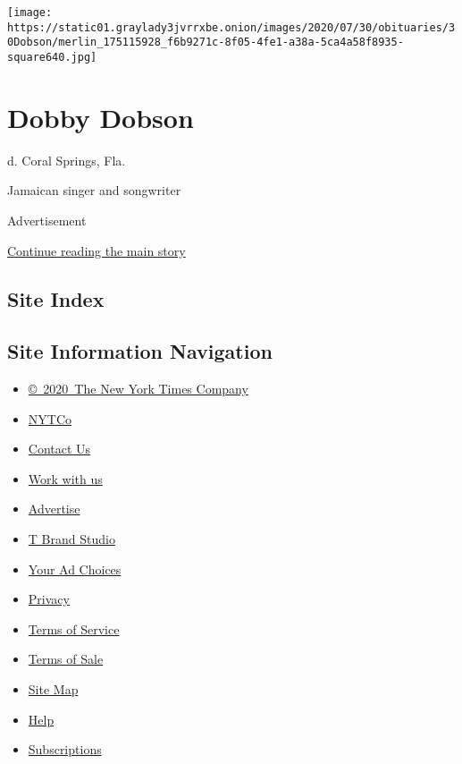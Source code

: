 \texttt{[image: https://static01.graylady3jvrrxbe.onion/images/2020/07/30/obituaries/30Dobson/merlin\_175115928\_f6b9271c-8f05-4fe1-a38a-5ca4a58f8935-square640.jpg]}

\hypertarget{dobby-dobson}{%
\section{Dobby Dobson}\label{dobby-dobson}}

d. Coral Springs, Fla.

Jamaican singer and songwriter

Advertisement

\protect\hyperlink{after-bottom}{Continue reading the main story}

\hypertarget{site-index}{%
\subsection{Site Index}\label{site-index}}

\hypertarget{site-information-navigation}{%
\subsection{Site Information
Navigation}\label{site-information-navigation}}

\begin{itemize}
\tightlist
\item
  \href{https://help.nytimes3xbfgragh.onion/hc/en-us/articles/115014792127-Copyright-notice}{©~2020~The
  New York Times Company}
\end{itemize}

\begin{itemize}
\tightlist
\item
  \href{https://www.nytco.com/}{NYTCo}
\item
  \href{https://help.nytimes3xbfgragh.onion/hc/en-us/articles/115015385887-Contact-Us}{Contact
  Us}
\item
  \href{https://www.nytco.com/careers/}{Work with us}
\item
  \href{https://nytmediakit.com/}{Advertise}
\item
  \href{http://www.tbrandstudio.com/}{T Brand Studio}
\item
  \href{https://www.nytimes3xbfgragh.onion/privacy/cookie-policy\#how-do-i-manage-trackers}{Your
  Ad Choices}
\item
  \href{https://www.nytimes3xbfgragh.onion/privacy}{Privacy}
\item
  \href{https://help.nytimes3xbfgragh.onion/hc/en-us/articles/115014893428-Terms-of-service}{Terms
  of Service}
\item
  \href{https://help.nytimes3xbfgragh.onion/hc/en-us/articles/115014893968-Terms-of-sale}{Terms
  of Sale}
\item
  \href{https://spiderbites.nytimes3xbfgragh.onion}{Site Map}
\item
  \href{https://help.nytimes3xbfgragh.onion/hc/en-us}{Help}
\item
  \href{https://www.nytimes3xbfgragh.onion/subscription?campaignId=37WXW}{Subscriptions}
\end{itemize}
